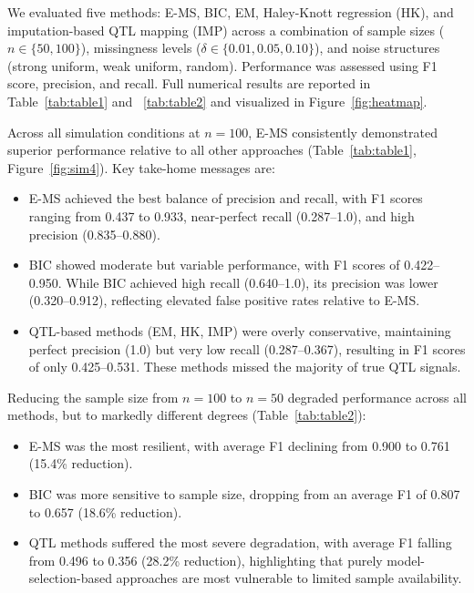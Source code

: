 \documentclass[
  12pt,
]{article}
\begin{document}
We evaluated five methods: E-MS, BIC, EM, Haley-Knott regression (HK), and imputation-based QTL mapping (IMP) across a combination of sample sizes ($n \in \{50, 100\}$), missingness levels ($\delta \in \{0.01, 0.05, 0.10\}$), and noise structures (strong uniform, weak uniform, random).
Performance was assessed using F1 score, precision, and recall. 
Full numerical results are reported in Table~\ref{tab:table1} and ~\ref{tab:table2}
and visualized in Figure~\ref{fig:heatmap}.


Across all simulation conditions at $n = 100$, E-MS consistently 
demonstrated superior performance relative to all other approaches 
(Table~\ref{tab:table1}, Figure~\ref{fig:sim4}). Key take-home messages are:

\begin{itemize}
    \item E-MS achieved the best balance of precision and recall, 
    with F1 scores ranging from 0.437 to 0.933, near-perfect recall 
    (0.287--1.0), and high precision (0.835--0.880).

    \item BIC showed moderate but variable performance, with F1 
    scores of 0.422--0.950. While BIC achieved high recall (0.640--1.0), 
    its precision was lower (0.320--0.912), reflecting elevated false 
    positive rates relative to E-MS.

    \item QTL-based methods (EM, HK, IMP) were overly conservative, 
    maintaining perfect precision (1.0) but very low recall (0.287--0.367), 
    resulting in F1 scores of only 0.425--0.531. These methods missed the 
    majority of true QTL signals.
\end{itemize}


Reducing the sample size from $n = 100$ to $n = 50$ degraded performance 
across all methods, but to markedly different degrees 
(Table~\ref{tab:table2}):

\begin{itemize}
    \item E-MS was the most resilient, with average F1 declining 
    from 0.900 to 0.761 (15.4\% reduction).

    \item BIC was more sensitive to sample size, dropping from an 
    average F1 of 0.807 to 0.657 (18.6\% reduction).

    \item QTL methods suffered the most severe degradation, with 
    average F1 falling from 0.496 to 0.356 (28.2\% reduction), highlighting 
    that purely model-selection-based approaches are most vulnerable to 
    limited sample availability.
\end{itemize}
\end{document}
